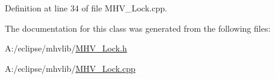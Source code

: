 \-Definition at line 34 of file \-M\-H\-V\-\_\-\-Lock.\-cpp.



\-The documentation for this class was generated from the following files\-:\begin{DoxyCompactItemize}
\item 
\-A\-:/eclipse/mhvlib/\hyperlink{_m_h_v___lock_8h}{\-M\-H\-V\-\_\-\-Lock.\-h}\item 
\-A\-:/eclipse/mhvlib/\hyperlink{_m_h_v___lock_8cpp}{\-M\-H\-V\-\_\-\-Lock.\-cpp}\end{DoxyCompactItemize}
